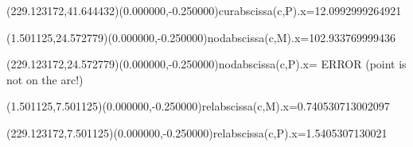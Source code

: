 \documentclass[12pt]{article}
\begin{document}
%
\fontsize{12.000000}{14.400000}\selectfont%
\ASYalign(229.123172,41.644432)(0.000000,-0.250000){curabscissa(c,P).x=12.0992999264921}%
%
%
\fontsize{12.000000}{14.400000}\selectfont%
\ASYalign(1.501125,24.572779)(0.000000,-0.250000){nodabscissa(c,M).x=102.933769999436}%
%
%
\fontsize{12.000000}{14.400000}\selectfont%
\ASYalign(229.123172,24.572779)(0.000000,-0.250000){nodabscissa(c,P).x= \scriptsize{ERROR (point is not on the arc!)}}%
%
%
\fontsize{12.000000}{14.400000}\selectfont%
\ASYalign(1.501125,7.501125)(0.000000,-0.250000){relabscissa(c,M).x=0.740530713002097}%
%
%
\fontsize{12.000000}{14.400000}\selectfont%
\ASYalign(229.123172,7.501125)(0.000000,-0.250000){relabscissa(c,P).x=1.5405307130021}%
\end{document}
